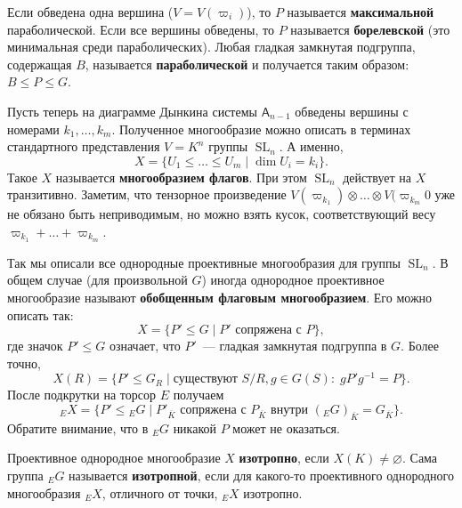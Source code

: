 \documentclass[a4paper]{article}
\DeclareMathOperator{\SL}{SL}
\renewcommand{\emptyset}{\varnothing}
\newcommand{\term}{\textbf}
\theoremstyle{definition}
\newcommand{\ol}{\overline}
\begin{document}
Если обведена одна вершина ($V = V(\varpi_i)$), то $P$ называется
\term{максимальной} параболической.
Если все вершины обведены, то $P$ называется \term{борелевской}
(это минимальная среди параболических).
Любая гладкая замкнутая подгруппа, содержащая $B$, называется
\term{параболической} и получается таким образом: $B\leq P \leq G$.

Пусть теперь на диаграмме Дынкина системы $\mathsf{A}_{n-1}$ обведены
вершины с номерами $k_1,\dots,k_m$.
Полученное многообразие можно описать в терминах стандартного
представления $V = K^n$ группы $\SL_n$.
А именно,
\[
X = \{U_1\leq\dots\leq U_m\mid \dim U_i = k_i\}.
\]
Такое $X$ называется \term{многообразием флагов}.
При этом $\SL_n$ действует на $X$ транзитивно.
Заметим, что тензорное произведение
$V(\varpi_{k_1})\otimes\dots\otimes V(\varpi_{k_m}0$ уже не обязано
быть неприводимым, но можно взять кусок, соответствующий
весу $\varpi_{k_1} + \dots + \varpi_{k_m}$.

Так мы описали все однородные проективные многообразия для группы
$\SL_n$.
В общем случае (для произвольной $G$) иногда однородное проективное
многообразие называют \term{обобщенным флаговым многообразием}.
Его можно описать так:
\[
X = \{P'\leq G\mid P'\mbox{ сопряжена с }P\},
\]
где значок $P'\leq G$ означает, что $P'$~--- гладкая замкнутая подгруппа
в $G$.
Более точно,
\[
X(R) = \{P'\leq G_R \mid\mbox{существуют }S/R, g\in G(S):\; gP'g^{-1} = P\}.
\]
После подкрутки на торсор $E$ получаем
\[
{}_{E}X = \{P'\leq {}_{E}G\mid P'_{\ol{K}}\mbox{ сопряжена с }P_{\ol{K}}
\mbox{ внутри }({}_{E}G)_{\ol{K}} = G_{\ol{K}}\}.
\]
Обратите внимание, что в ${}_{E}G$ никакой $P$ может не оказаться.

Проективное однородное многообразие $X$ \term{изотропно},
если $X(K)\neq\emptyset$.
Сама группа ${}_{E}G$ называется \term{изотропной}, если для какого-то
проективного однородного многообразия ${}_{E}X$, отличного от точки,
${}_{E}X$ изотропно.
\end{document}
